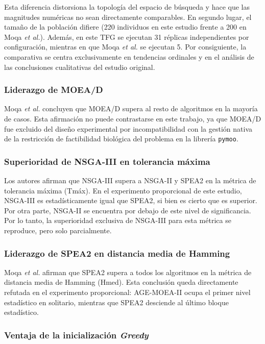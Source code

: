Esta diferencia distorsiona la topología del espacio de búsqueda y hace que las magnitudes numéricas no sean directamente comparables. En segundo lugar, el tamaño de la población difiere (220 individuos en este estudio frente a 200 en Moqa \textit{et al.}). Además, en este TFG se ejecutan 31 réplicas independientes por configuración, mientras en que Moqa \textit{et al.} se ejecutan 5. Por consiguiente, la comparativa se centra exclusivamente en tendencias ordinales y en el análisis de las conclusiones cualitativas del estudio original.

\subsubsection*{Liderazgo de MOEA/D}

Moqa \textit{et al.} concluyen que MOEA/D supera al resto de algoritmos en la mayoría de casos. Esta afirmación no puede contrastarse en este trabajo, ya que MOEA/D fue excluido del diseño experimental por incompatibilidad con la gestión nativa de la restricción de factibilidad biológica del problema en la librería \texttt{pymoo}.

\subsubsection*{Superioridad de NSGA-III en tolerancia máxima}

Los autores afirman que NSGA-III supera a NSGA-II y SPEA2 en la métrica de tolerancia máxima (Tmáx). En el experimento proporcional de este estudio, NSGA-III es estadísticamente igual que SPEA2, si bien es cierto que es superior. Por otra parte, NSGA-II se encuentra por debajo de este nivel de significancia. Por lo tanto, la superioridad exclusiva de NSGA-III para esta métrica se reproduce, pero solo parcialmente.

\subsubsection*{Liderazgo de SPEA2 en distancia media de Hamming}

Moqa \textit{et al.} afirman que SPEA2 supera a todos los algoritmos en la métrica de distancia media de Hamming (Hmed). Esta conclusión queda directamente refutada en el experimento proporcional: AGE-MOEA-II ocupa el primer nivel estadístico en solitario, mientras que SPEA2 desciende al último bloque estadístico.

\subsubsection*{Ventaja de la inicialización \textit{Greedy}}

